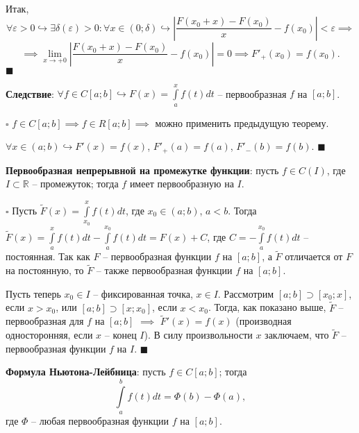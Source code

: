 \documentclass[12pt, a4paper, reqno]{article}
\begin{document}
    Итак,
    \begin{equation*}
        \forall \varepsilon > 0 \hookrightarrow \exists \delta(\varepsilon) > 0:
        \forall x \in (0; \delta) \hookrightarrow
        \left|\frac{F(x_0 + x) - F(x_0)}{x} - f(x_0)\right| < \varepsilon \implies
    \end{equation*}
    \begin{equation*}
        \implies \lim\limits_{x \to +0} \left|\frac{F(x_0 + x) - F(x_0)}{x} - f(x_0)\right| = 0 \implies
        F'_{+}(x_0) = f(x_0).
    \end{equation*}
    $\blacksquare$

    \textbf{Следствие}: $\forall f \in C[a; b] \hookrightarrow F(x) = \int\limits_{a}^{x} f(t)dt$ --
    первообразная $f$ на $[a; b]$.

    $\square$
    $f \in C[a; b] \implies f \in R[a; b] \implies$ можно применить предыдущую теорему.

    $\forall x \in (a; b) \hookrightarrow F'(x) = f(x)$, $F'_{+}(a) = f(a)$, $F'_{-}(b) = f(b)$.
    $\blacksquare$

    \textbf{Первообразная непрерывной на промежутке функции}: пусть $f \in C(I)$, где
    $I \subset \mathbb{R}$ -- промежуток; тогда $f$ имеет первообразную на $I$.

    $\square$
    Пусть $\tilde{F}(x) = \int\limits_{x_0}^{x} f(t)dt$, где $x_0 \in (a; b)$, $a < b$. Тогда
    $\tilde{F}(x) = \int\limits_{a}^{x} f(t)dt  - \int\limits_{a}^{x_0} f(t)dt = F(x) + C$, где
    $C = -\int\limits_{a}^{x_0} f(t)dt$ -- постоянная. Так как $F$ -- первообразная функции $f$ на
    $[a; b]$, а $\tilde{F}$ отличается от $F$ на постоянную, то $\tilde{F}$ -- также первообразная
    функции $f$ на $[a; b]$.

    Пусть теперь $x_0 \in I$ -- фиксированная точка, $x \in I$. Рассмотрим $[a; b] \supset [x_0; x]$,
    если $x > x_0$, или $[a; b] \supset [x; x_0]$, если $x < x_0$. Тогда, как показано выше, $\tilde{F}$ --
    первообразная для $f$ на $[a; b]$ $\implies$ $\tilde{F}'(x) = f(x)$ (производная односторонняя,
    если $x$ -- конец $I$). В силу произвольности $x$ заключаем, что $\tilde{F}$ -- первообразная
    функции $f$ на $I$.
    $\blacksquare$

    \textbf{Формула Ньютона-Лейбница}: пусть $f \in C[a; b]$; тогда
    \begin{equation*}
        \int\limits_{a}^{b} f(t)dt = \Phi(b) - \Phi(a),
    \end{equation*}
    где $\Phi$ -- любая первообразная функции $f$ на $[a; b]$.
\end{document}
